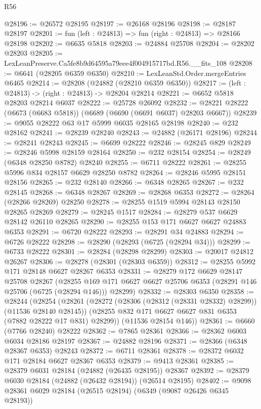 \begin{lexlean}{R56}
\begin{coremodule}
@28196 := @26572 @28195
@28197 := @26168 @28196
@28198 := @28187 @28197
@28201 := fun (left : @24813) => fun (right : @24813) => @28166 @28198
@28202 := @6635 @5818
@28203 := @24884 @25708
@28204 := @28202 @28203
@28205 := LexLeanPreserve.Ca5fe8b9d64595a79eee4f004915717bd.R56.__fits_108
@28208 := @6641 (@28205 @6359 @6350)
@28210 := LexLeanStd.Order.mergeEntries @6465
@28214 := @28208 (@24882 (@28210 @6359 @6350))
@28217 := (left : @24813) -> (right : @24813) -> @28204 @28214
@28221 := @6652 @5818 @28203 @28214 @6037
@28222 := @25728 @26092
@28232 := @28221 @28222 (@6673 (@6683 @5818)) (@6689 (@6690 (@6691 @6037) @28203 @6667))
@28239 := @9055 @28222 @63 @17 @5999 @6035 @28165 @28198
@28240 := @232 @28162
@28241 := @28239 @28240
@28243 := @24882 (@26171 @28196)
@28244 := @28241 @28243
@28245 := @6699 @28222
@28246 := @28245 @829
@28249 := @28246 @5998 @28159 @28164
@28250 := @232 @28154
@28254 := @28249 (@6348 @28250 @8782) @28240
@28255 := @6711 @28222
@28261 := @28255 @5996 @834 @28157 @6629 @28250 @8782
@28264 := @28246 @5995 @28151 @28156
@28265 := @232 @28140
@28266 := @6348 @28265
@28267 := @232 @28145
@28268 := @6348 @28267
@28269 := @28268 @6353
@28272 := @28264 (@28266 @28269) @28250
@28278 := @28255 @1519 @5994 @28143 @28150 @28265 @28269
@28279 := @28245 @1517
@28284 := @28279 @537 @6629 @28142 @26110 @28265
@28290 := @28255 @153 @171 @6627 @6627 @24883 @6353
@28291 := @6720 @28222
@28293 := @28291 @34 @24883
@28294 := @6726 @28222
@28298 := @28290 (@28293 (@6725 (@28294 @34)))
@28299 := @6733 @28222
@28301 := @28284 (@28298 @28299)
@28303 := @20017 @24812 @26267
@28306 := @28278 (@28301 (@28303 @6359))
@28312 := @28255 @5992 @171 @28148 @6627 @28267 @6353
@28331 := @28279
    @172
    @6629
    @28147
    @25708
    @28267
    (@28255 @169 @171 @6627 @6627 @25706 @6353 (@28291 @146 @25706 (@6725 (@28294 @146))) @28299)
@28332 := @28303 @6350
@28358 := @28244
    (@28254
      (@28261
        (@28272 (@28306 (@28312 (@28331 @28332) @28299)) (@11536 @28140 @28145))
        (@28255 @832 @171 @6627 @6627 @831 @6353 (@7882 @28222 @17 @831) @28299))
      (@11536 @28154 @146))
@28361 := @6660 (@7766 @28240) @28222
@28362 := @7865 @28361
@28366 := @28362 @6003 @6034 @28186 @28197
@28367 := @24882 @28196
@28371 := @28366 (@6348 @28367 @6353) @28243
@28372 := @6711 @28361
@28378 := @28372 @6032 @171 @28184 @6627 @28367 @6353
@28379 := @9413 @28361
@28385 := @28379 @6031 @28184 (@24882 (@26435 @28195)) @28367
@28392 := @28379 @6030 @28184 (@24882 (@26432 @28194)) (@26514 @28195)
@28402 := @9098 @28361 @6029 @28184 (@26515 @28194) (@6349 (@9087 @26426 @6345 @28193))

\end{coremodule}
\end{lexlean}
